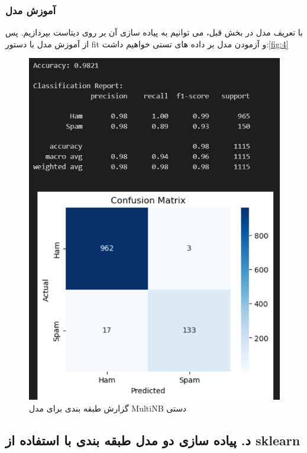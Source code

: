 \documentclass{article}
\begin{document}
\subsubsection{آموزش مدل}
با تعریف مدل در بخش قبل، می توانیم به پیاده سازی آن بر روی دیتاست بپردازیم. 
پس از آموزش مدل با دستور fit و آزمودن مدل بر داده های تستی خواهیم داشت:\autoref{fig:4}

\begin{figure}
    \centering
\includegraphics[width=1\linewidth]{4.png}
    \caption{گزارش طبقه بندی برای مدل MultiNB دستی}
    \label{fig:4}
\end{figure}
\clearpage

\subsection{د. پیاده سازی دو مدل طبقه بندی با استفاده از sklearn}
\end{document}
